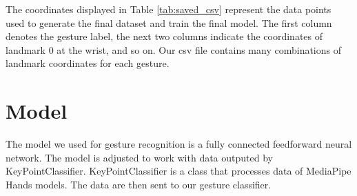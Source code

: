 The coordinates displayed in Table \ref{tab:saved_csv} represent the data points used to generate the final dataset and train the final model. The first column denotes the gesture label, the next two columns indicate the coordinates of landmark 0 at the wrist, and so on. Our csv file contains many combinations of landmark coordinates for each gesture.



\section{Model}

The model we used for gesture recognition is a fully connected feedforward neural network. The model is adjusted to work with data outputed by KeyPointClassifier. KeyPointClassifier is a class that processes data of MediaPipe Hands models. The data are then sent to our gesture classifier.


